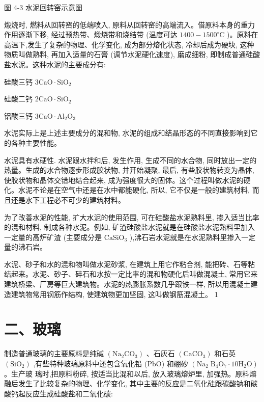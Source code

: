 \documentclass[10pt]{article}
\begin{document}
图 4-3 水泥回转窑示意图

煅烧时, 燃料从回转窑的低端喷入, 原料从回转窑的高端流入。借原料本身的重力作用逐渐下移, 经过预热带、煅烧带和烧结带 (温度可达 \({1400} - {1500}^{ \circ }\mathrm{C}\) )。原料在高温下,发生了复杂的物理、化学变化, 成为部分熔化状态, 冷却后成为硬块, 这种物质叫做熟料, 再加入适量的石膏 (调节水泥硬化速度), 磨成细粉, 即制成普通硅酸盐水泥。这种水泥的主要成分有:

硅酸三钙 \(3\mathrm{{CaO}} \cdot {\mathrm{{SiO}}}_{2}\)

硅酸二钙 \(2\mathrm{{CaO}} \cdot {\mathrm{{SiO}}}_{2}\)

铝酸三钙 \(3\mathrm{{CaO}} \cdot {\mathrm{{Al}}}_{2}{\mathrm{O}}_{3}\)

水泥实际上是上述主要成分的混和物, 水泥的组成和结晶形态的不同直接影响到它的各种主要性能。

水泥具有水硬性. 水泥跟水拌和后, 发生作用, 生成不同的水合物, 同时放出一定的热量。生成的水合物逐步形成胶状物, 并开始凝聚, 最后, 有些胶状物转变为晶体, 使胶状物和晶体交错地结合起来, 成为强度很大的固体。这个过程叫做水泥的硬化。水泥不论是在空气中还是在水中都能硬化, 所以, 它不仅是一般的建筑材料, 而且还是水下工程必不可少的建筑材料。

为了改善水泥的性能, 扩大水泥的使用范围, 可在硅酸盐水泥熟料里, 掺入适当比率的混和材料, 制成各种水泥。例如, 矿渣硅酸盐水泥就是在硅酸盐水泥熟料里加入一定量的高炉矿渣 (主要成分是 \({\mathrm{{CaSiO}}}_{3}\) ),沸石岩水泥就是在水泥熟料里掺入一定量的沸石岩。

水泥、砂子和水的混和物叫做水泥砂浆, 在建筑上用它作粘合剂, 能把砖、石等粘结起来。水泥、砂子、碎石和水按一定比率的混和物硬化后叫做混凝土, 常用它来建筑桥梁、厂房等巨大建筑物。水泥的热膨胀系数几乎跟铁一样, 所以用混凝土建造建筑物常用钢筋作结构, 使建筑物更加坚固, 这叫做钢筋混凝土。 1

\section*{二、玻璃}

制造普通玻璃的主要原料是纯碱 \(\left( {{\mathrm{{Na}}}_{2}{\mathrm{{CO}}}_{3}}\right)\) 、石灰石 \(\left( {\mathrm{{CaCO}}}_{3}\right)\) 和石英 \(\left( {\mathrm{{SiO}}}_{2}\right)\) ,有些特种玻璃原料中还包含氧化铅 (PbO) 和硼砂 \(\left( {{\mathrm{{Na}}}_{2}{\mathrm{\;B}}_{4}{\mathrm{O}}_{7} \cdot {10}{\mathrm{H}}_{2}\mathrm{O}}\right)\) 。生产玻 璃时,把原料粉碎, 按适当比混和以后, 放入玻璃熔炉里, 加强热。原料熔融后发生了比较复杂的物理、化学变化, 其中主要的反应是二氧化硅跟碳酸钠和碳酸钙起反应生成硅酸盐和二氧化碳:
\end{document}
